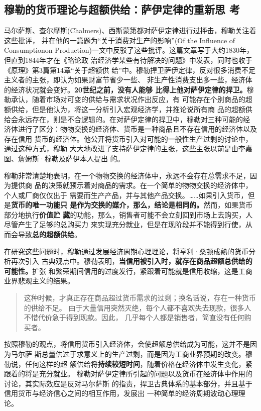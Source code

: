 \subsection[穆勒的货币理论与超额供给]{穆勒的货币理论与超额供给：萨伊定律的重新思
  考}
马尔萨斯、查尔摩斯(Chalmers)、西斯蒙第都对萨伊定律进行过抨击，穆勒关注着这些批评，
并在他的一篇题为“关于消费对生产的影响”(Of the Influence of Consumptionon
Production)一文中反驳了这些批评。这篇文章写于大约1830年，但直到1844年才在《略论政
治经济学某些有待解决的问题》中发表，同时也收于《原理》第3篇第14章“关于超额供
给”中。穆勒捍卫萨伊定律，反对很多消费不足主义者的主张，即认为如果财富节省少一些、
非生产性消费支出多一些，经济体的经济状况就会变好。\textbf{20世纪之前，没有人能够
  比得上他对萨伊定律的捍卫。}穆勒承认，随着市场对可变的供给与需求状况作出反应，有
可能存在个别商品的超额供给，但是他认为，将这一分析引入宏观经济学，并推论说所有商
品的超额供给会永远存在，则是不合逻辑的。在对萨伊定律的捍卫中，穆勒对三种可能的经
济体进行了区分：物物交换的经济体、货币是一种商品且不存在信用的经济体以及存在信用
货币的经济体。他公开将货币引入对可能的一般性生产过剩的讨论中，通过这种方式，穆勒
大大地改进了支持萨伊定律的主张，这些主张以前是由李嘉图、詹姆斯·穆勒及萨伊本人提出
的。

穆勒非常清楚地表明，在一个物物交换的经济体中，永远不会存在总需求不足，因为提供商
品的决策就预示着对商品的需求。在一个简单的物物交换的经济体中，个人或厂商仅仅出于
需要而生产产品，并与其他产品交换。……如果引入货币，但是\textbf{货币的唯一功能只
  是作为交换的媒介，那么，结论是相同的。}然而，如果货币部分地执行\textbf{价值贮
  藏}的功能，那么，销售者可能不会立刻回到市场上去购买，人尽管产生了足够的总购买力
来实现充分就业，但是在现阶段并不能得到行使，从而会导致\textbf{总的超额供给}。

在研究这些问题时，穆勒通过发展经济周期心理理论，将亨利·桑顿成熟的货币分析再次引入
古典观点中。穆勒表明，\textbf{当信用被引入时，就存在商品超额总供给的可能性。}扩张
和繁荣期间信用的过度发行，紧跟着可能就是信用收缩，这是工商业界悲观主义的结果。
\begin{quotation}
  这种时候，才真正存在商品超过货币需求的过剩；换名话说，存在一种货币的供给不足。
  由于大量信用突然灭绝，每个人都不喜欢失去现款，很多人不惜代价急于得到现款。因此，
  几乎每个人都是销售者，简直没有任何购买者。
\end{quotation}

按照穆勒的观点，将信用货币引入经济体，会使超额总供给成为可能，这并不是因为马尔萨
斯总量供过于求意义上的生产过剩，而是因为工商业界预期的改变。穆勒说，任何这样的超
额供给将\textbf{持续较短时间}，随着价格在经济体中发生变化，紧跟着的将是充分就业。
穆勒对萨伊定律所引起的问题以及货币在经济体中作用的讨论，其实际效应是反对马尔萨斯
的指责，捍卫古典体系的基本部分，并且基于信用货币与经济信心之间的相互作用，发展出
一种简单的经济周期波动心理理论。

